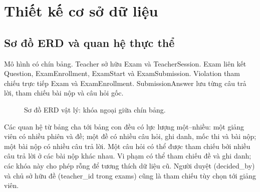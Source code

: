\section{Thiết kế cơ sở dữ liệu}
\subsection{Sơ đồ ERD và quan hệ thực thể}
Mô hình có chín bảng. Teacher sở hữu Exam và TeacherSession. Exam liên kết Question, ExamEnrollment, ExamStart và ExamSubmission. Violation tham chiếu trực tiếp Exam và ExamEnrollment. SubmissionAnswer lưu từng câu trả lời, tham chiếu bài nộp và câu hỏi gốc.
\begin{figure}[H]\centering
\caption{Sơ đồ ERD vật lý: khóa ngoại giữa chín bảng.}\end{figure}

Các quan hệ từ bảng cha tới bảng con đều có lực lượng một--nhiều: một giảng viên có nhiều phiên và đề; một đề có nhiều câu hỏi, ghi danh, mốc thi và bài nộp; một bài nộp có nhiều câu trả lời. Một câu hỏi có thể được tham chiếu bởi nhiều câu trả lời ở các bài nộp khác nhau. Vi phạm có thể tham chiếu đề và ghi danh; các khóa này cho phép rỗng để tương thích dữ liệu cũ. Người duyệt (decided\_by) và chủ sở hữu đề (teacher\_id trong exams) cũng là tham chiếu tùy chọn tới giảng viên.

